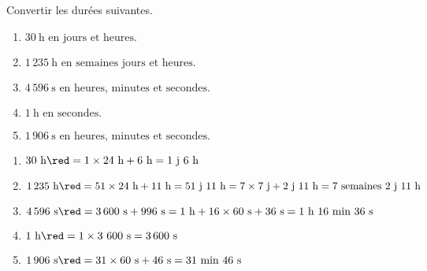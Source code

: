 \begin{exercice}
    Convertir les durées suivantes.
    \begin{enumerate}        
            \item $30~\text{h en jours et heures.}$
            \item $1\,235~\text{h en semaines jours et heures.}$
            \item $4\,596~\text{s en heures, minutes et secondes.}$
            \item $1~\text{h en secondes.}$
            \item $1\,906~\text{s en heures, minutes et secondes.}$
    \end{enumerate}
\end{exercice}
\begin{corrige}
    \begin{enumerate}
        \item $30~\text{h}      {\red = 1\times24~\text{h} + 6~\text{h} = 1~\text{j}~6~\text{h}}$
        \item $1\,235~\text{h}  {\red = 51\times24~\text{h} + 11~\text{h} = 51~\text{j}~11~\text{h} = 7\times7~\text{j} + 2~\text{j}~11~\text{h} = 7~\text{semaines}~2~\text{j}~11~\text{h}}$
        \item $4\,596~\text{s}  {\red = 3\,600~\text{s}+996~\text{s} =1~\text{h}+16\times60~\text{s}+36~\text{s}=1~\text{h}~16~\text{min}~36~\text{s}}$
        \item $1~\text{h}       {\red = 1\times3~600~\text{s} = 3\,600~\text{s}}$
        \item $1\,906~\text{s}  {\red = 31\times60~\text{s}+46~\text{s}=31~\text{min}~46~\text{s}}$
    \end{enumerate}   
\end{corrige}